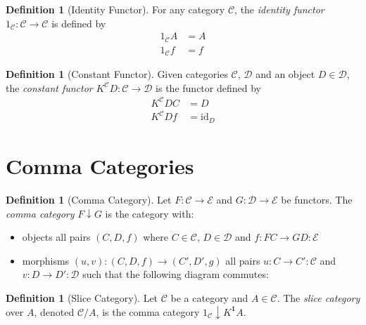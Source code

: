 \documentclass{book}
\theoremstyle{definition}
\newtheorem{df}[prop]{Definition}
\newcommand{\id}[1]{\ensuremath{\mathrm{id}_{#1}}}
\begin{document}
\begin{df}[Identity Functor]
    For any category $\mathcal{C}$, the \emph{identity functor} $1_\mathcal{C} : \mathcal{C} \rightarrow \mathcal{C}$ is defined by
    \begin{align*}
        1_\mathcal{C} A & = A \\
        1_\mathcal{C} f & = f
    \end{align*}
\end{df}

\begin{df}[Constant Functor]
    Given categories $\mathcal{C}$, $\mathcal{D}$ and an object $D \in \mathcal{D}$, the \emph{constant functor} $K^\mathcal{C} D : \mathcal{C} \rightarrow \mathcal{D}$ is the functor defined by
    \begin{align*}
        K^\mathcal{C} D C & = D \\
        K^\mathcal{C} D f & = \id{D}
    \end{align*}
\end{df}

\section{Comma Categories}

\begin{df}[Comma Category]
    Let $F : \mathcal{C} \rightarrow \mathcal{E}$ and $G : \mathcal{D} \rightarrow \mathcal{E}$ be functors. The \emph{comma category} $F \downarrow G$ is the category with:
    \begin{itemize}
        \item objects all pairs $(C,D,f)$ where $C \in \mathcal{C}$, $D \in \mathcal{D}$ and $f : FC \rightarrow GD : \mathcal{E}$
        \item morphisms $(u,v) : (C,D,f) \rightarrow (C',D',g)$ all pairs $u : C \rightarrow C' : \mathcal{C}$ and $v : D \rightarrow D' : \mathcal{D}$ such that the following diagram commutes:

    \end{itemize}
\end{df}

\begin{df}[Slice Category]
    Let $\mathcal{C}$ be a category and $A \in \mathcal{C}$. The \emph{slice category} over $A$, denoted $\mathcal{C} / A$, is the comma category $1_\mathcal{C} \downarrow K^{\mathbf{1}} A$.
\end{df}
\end{document}
